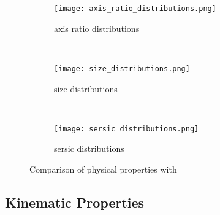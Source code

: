 \documentclass[a4paper,fleqn,usenatbib]{mn2e}
\begin{document}
\begin{figure*}
    \centering
    \begin{subfigure}[t]{0.32\textwidth}
        \centering
        \texttt{[image: axis\_ratio\_distributions.png]}
        \caption{axis ratio distributions}
    \end{subfigure}%
    ~
    \begin{subfigure}[t]{0.32\textwidth}
        \centering
        \texttt{[image: size\_distributions.png]}
        \caption{size distributions}
    \end{subfigure}
    ~
    \begin{subfigure}[t]{0.32\textwidth}
        \centering
        \texttt{[image: sersic\_distributions.png]}
        \caption{sersic distributions}
    \end{subfigure}
    \caption{Comparison of physical properties with}
\end{figure*}


\subsection{Kinematic Properties}\label{subsec:Kinematic Properties}
\end{document}
